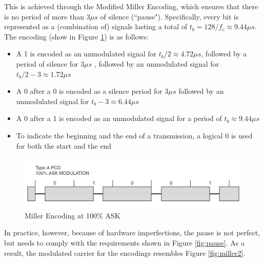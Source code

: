 \documentclass[fleqn,10pt]{SelfArx} %
\newcommand{\ms}{\ensuremath{\mu s} }
\begin{document}
This is achieved through the Modified Miller Encoding, which ensures that there is no period of more than 3\ms of silence (``pause"). Specifically, every bit is represented as a (combination of) signals lasting a total of $t_b=128/f_c\approx9.44\ms$. The encoding (show in Figure \ref{fig:miller}) is as follows:
\begin{itemize}[noitemsep] 
\item A 1 is encoded as an unmodulated signal for $t_b/2\approx 4.72 \ms$, followed by a period of silence for 3\ms, followed by an unmodulated signal for $t_b/2-3\approx 1.72\ms$
\item A 0 after a 0 is encoded as a silence period for 3\ms followed by an unmodulated signal for $t_b-3\approx 6.44\ms$
\item A 0 after a 1 is encoded as an unmodulated signal for a period of $t_b\approx9.44\ms$
\item To indicate the beginning and the end of a transmission, a logical 0 is used for both the start and the end
\end{itemize}

\begin{figure}[h]
  \includegraphics[width=\linewidth]{img/miller.png}
  \caption{Miller Encoding at 100\% ASK \cite{atmel}}
  \label{fig:miller}
\end{figure}

In practice, however, because of hardware imperfections, the pause is not perfect, but needs to comply with the requirements shown in Figure \ref{fig:pause}. As a result, the modulated carrier for the encodings resembles Figure \ref{fig:miller2}.
\end{document}
